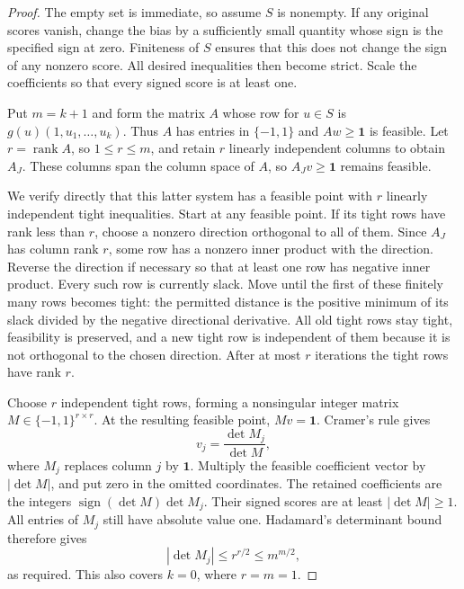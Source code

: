 \begin{proof}
The empty set is immediate, so assume $S$ is nonempty. If any original
scores vanish, change the bias by a sufficiently small quantity whose
sign is the specified sign at zero. Finiteness of $S$ ensures that this
does not change the sign of any nonzero score. All desired inequalities
then become strict. Scale the coefficients so that every signed score
is at least one.

Put $m=k+1$ and form the matrix $A$ whose row for $u\in S$ is
$g(u)(1,u_1,\ldots,u_k)$. Thus $A$ has entries in $\{-1,1\}$ and
$Aw\ge\boldsymbol1$ is feasible. Let $r=\operatorname{rank}A$, so
$1\le r\le m$, and retain $r$ linearly independent columns to obtain
$A_J$. These columns span the column space of $A$, so
$A_Jv\ge\boldsymbol1$ remains feasible.

We verify directly that this latter system has a feasible point with
$r$ linearly independent tight inequalities. Start at any feasible
point. If its tight rows have rank less than $r$, choose a nonzero
direction orthogonal to all of them. Since $A_J$ has column rank $r$,
some row has a nonzero inner product with the direction. Reverse the
direction if necessary so that at least one row has negative inner
product. Every such row is currently slack. Move until the first of
these finitely many rows becomes tight: the permitted distance is the
positive minimum of its slack divided by the negative directional
derivative. All old tight rows stay tight, feasibility is preserved,
and a new tight row is independent of them because it is not
orthogonal to the chosen direction. After at most $r$ iterations the
tight rows have rank $r$.

Choose $r$ independent tight rows, forming a nonsingular integer
matrix $M\in\{-1,1\}^{r\times r}$. At the resulting feasible point,
$Mv=\boldsymbol1$. Cramer's rule gives
\[
 v_j=\frac{\det M_j}{\det M},
\]
where $M_j$ replaces column $j$ by $\boldsymbol1$. Multiply the
feasible coefficient vector by $|\det M|$, and put zero in the omitted
coordinates. The retained coefficients are the integers
$\operatorname{sign}(\det M)\det M_j$. Their signed scores are at
least $|\det M|\ge1$. All entries of $M_j$ still have absolute value
one. Hadamard's determinant bound therefore gives
\[
 |\det M_j|\le r^{r/2}\le m^{m/2},
\]
as required. This also covers $k=0$, where $r=m=1$.
\end{proof}

